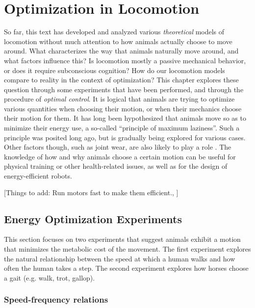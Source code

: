 \chapter{Optimization in Locomotion}
\label{sec:OptimizationInLocomotion}

So far, this text has developed and analyzed various \textit{theoretical} models of locomotion without much attention to how animals actually choose to move around. What characterizes the way that animals naturally move around, and what factors influence this? Is locomotion mostly a passive mechanical behavior, or does it require subconscious cognition? How do our locomotion models compare to reality in the context of optimization? This chapter explores these question through some experiments that have been performed, and through the procedure of \textit{optimal control}. It is logical that animals are trying to optimize various quantities when choosing their motion, or when their mechanics choose their motion for them. It has long been hypothesized that animals move so as to minimize their energy use, a so-called ``principle of maximum laziness''. Such a principle was posited long ago, but is gradually being explored for various cases. Other factors though, such as joint wear, are also likely to play a role \cite{bertram01}. The knowledge of how and why animals choose a certain motion can be useful for physical training or other health-related issues, as well as for the design of energy-efficient robots.

[Things to add: Run motors fast to make them efficient., ]

\section{Energy Optimization Experiments} %
\label{sec:EnergyOptimization}

This section focuses on two experiments that suggest animals exhibit a motion that minimizes the metabolic cost of the movement. The first experiment explores the natural relationship between the speed at which a human walks and how often the human takes a step. The second experiment explores how horses choose a gait (e.g. walk, trot, gallop).

\subsection{Speed-frequency relations}
\label{sec:SpeedFrequencyRelations}

